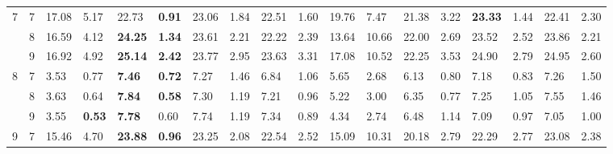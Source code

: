 \documentclass[conference]{IEEEtran}
\begin{document}
\begin{table}[]
\begin{tabular}{|cl|ll|ll|ll|ll|ll|ll|ll|ll|}
		\multicolumn{1}{|c|}{\multirow{3}{*}{7}} & 7 & \multicolumn{1}{l|}{17.08} & 5.17 & \multicolumn{1}{l|}{22.73} & \textbf{0.91} & \multicolumn{1}{l|}{23.06} & 1.84 & \multicolumn{1}{l|}{22.51} & 1.60 & \multicolumn{1}{l|}{19.76} & 7.47 & \multicolumn{1}{l|}{21.38} & 3.22 & \multicolumn{1}{l|}{\textbf{23.33}} & 1.44 & \multicolumn{1}{l|}{22.41} & 2.30 \\ \cline{2-18} 
		\multicolumn{1}{|c|}{} & 8 & \multicolumn{1}{l|}{16.59} & 4.12 & \multicolumn{1}{l|}{\textbf{24.25}} & \textbf{1.34} & \multicolumn{1}{l|}{23.61} & 2.21 & \multicolumn{1}{l|}{22.22} & 2.39 & \multicolumn{1}{l|}{13.64} & 10.66 & \multicolumn{1}{l|}{22.00} & 2.69 & \multicolumn{1}{l|}{23.52} & 2.52 & \multicolumn{1}{l|}{23.86} & 2.21 \\ \cline{2-18} 
		\multicolumn{1}{|c|}{} & 9 & \multicolumn{1}{l|}{16.92} & 4.92 & \multicolumn{1}{l|}{\textbf{25.14}} & \textbf{2.42} & \multicolumn{1}{l|}{23.77} & 2.95 & \multicolumn{1}{l|}{23.63} & 3.31 & \multicolumn{1}{l|}{17.08} & 10.52 & \multicolumn{1}{l|}{22.25} & 3.53 & \multicolumn{1}{l|}{24.90} & 2.79 & \multicolumn{1}{l|}{24.95} & 2.60 \\ \hline
		\multicolumn{1}{|c|}{\multirow{3}{*}{8}} & 7 & \multicolumn{1}{l|}{3.53} & 0.77 & \multicolumn{1}{l|}{\textbf{7.46}} & \textbf{0.72} & \multicolumn{1}{l|}{7.27} & 1.46 & \multicolumn{1}{l|}{6.84} & 1.06 & \multicolumn{1}{l|}{5.65} & 2.68 & \multicolumn{1}{l|}{6.13} & 0.80 & \multicolumn{1}{l|}{7.18} & 0.83 & \multicolumn{1}{l|}{7.26} & 1.50 \\ \cline{2-18} 
		\multicolumn{1}{|c|}{} & 8 & \multicolumn{1}{l|}{3.63} & 0.64 & \multicolumn{1}{l|}{\textbf{7.84}} & \textbf{0.58} & \multicolumn{1}{l|}{7.30} & 1.19 & \multicolumn{1}{l|}{7.21} & 0.96 & \multicolumn{1}{l|}{5.22} & 3.00 & \multicolumn{1}{l|}{6.35} & 0.77 & \multicolumn{1}{l|}{7.25} & 1.05 & \multicolumn{1}{l|}{7.55} & 1.46 \\ \cline{2-18} 
		\multicolumn{1}{|c|}{} & 9 & \multicolumn{1}{l|}{3.55} & \textbf{0.53} & \multicolumn{1}{l|}{\textbf{7.78}} & 0.60 & \multicolumn{1}{l|}{7.74} & 1.19 & \multicolumn{1}{l|}{7.34} & 0.89 & \multicolumn{1}{l|}{4.34} & 2.74 & \multicolumn{1}{l|}{6.48} & 1.14 & \multicolumn{1}{l|}{7.09} & 0.97 & \multicolumn{1}{l|}{7.05} & 1.00 \\ \hline
		\multicolumn{1}{|c|}{\multirow{3}{*}{9}} & 7 & \multicolumn{1}{l|}{15.46} & 4.70 & \multicolumn{1}{l|}{\textbf{23.88}} & \textbf{0.96} & \multicolumn{1}{l|}{23.25} & 2.08 & \multicolumn{1}{l|}{22.54} & 2.52 & \multicolumn{1}{l|}{15.09} & 10.31 & \multicolumn{1}{l|}{20.18} & 2.79 & \multicolumn{1}{l|}{22.29} & 2.77 & \multicolumn{1}{l|}{23.08} & 2.38 \\ \cline{2-18} 

\end{tabular}
\end{table}
\end{document}
